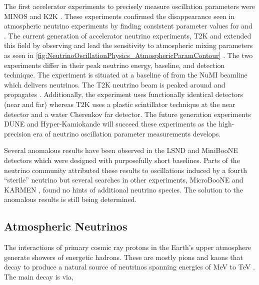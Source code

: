 The first accelerator experiments to precisely measure oscillation parameters were MINOS \cite{PhysRevLett.97.191801} and K2K \cite{PhysRevLett.9.36}.
These experiments confirmed the \quickmath{\nu_{\mu}} disappearance seen in atmospheric neutrino experiments by finding consistent parameter values for  and .
The current generation of accelerator neutrino experiments, T2K and  extended this field by observing  and lead the sensitivity to atmospheric mixing parameters as seen in \autoref{fig:NeutrinoOscillationPhysics_AtmosphericParamContour} \cite{PhysRevLett.123.151803}.
The two experiments differ in their peak neutrino energy, baseline, and detection technique.
The  experiment is situated at a baseline of  from the NuMI beamline which delivers  neutrinos.
The T2K neutrino beam is peaked around  and propagates  \cite{t2k_det}.
Additionally, the  experiment uses functionally identical detectors (near and far) whereas T2K uses a plastic scintillator technique at the near detector and a water Cherenkov far detector.
The future generation experiments DUNE \cite{Abi2020-cm} and Hyper-Kamiokande \cite{Hyper-Kamiokande_Proto-Collaboration2015-ac} will succeed these experiments as the high-precision era of neutrino oscillation parameter measurements develops.

Several anomalous results have been observed in the LSND \cite{PhysRevD.64.112007} and MiniBooNE \cite{PhysRevLett.110.161801} detectors which were designed with purposefully short baselines. Parts of the neutrino community attributed these results to oscillations induced by a fourth ``sterile'' neutrino \cite{Blanco_2020} but several searches in other experiments, MicroBooNE \cite{10.48550/arxiv.2110.14054} and KARMEN \cite{PhysRevD.65.112001}, found no hints of additional neutrino species. The solution to the anomalous results is still being determined.

\subsection{Atmospheric Neutrinos}
\label{subsec:NeutrinoOscillationPhysics_AtmosphericNeutrinos}

The interactions of primary cosmic ray protons in the Earth's upper atmosphere generate showers of energetic hadrons. These are mostly pions and kaons that decay to produce a natural source of neutrinos spanning energies of MeV to TeV \cite{Gaisser2002-gl}. The main decay is via,

